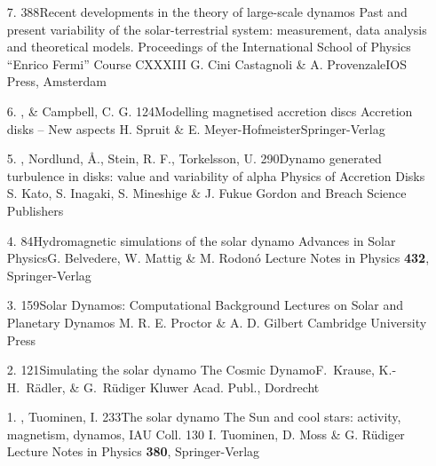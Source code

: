 \begin{itemize}
\item[7.]
\Brandenburg{}
{388}{Recent developments in the theory of large-scale dynamos}
{Past and present variability of the solar-terrestrial system:
measurement, data analysis and theoretical models.
Proceedings of the International School of Physics
``Enrico Fermi'' Course CXXXIII}
{G. Cini Castagnoli \& A. Provenzale}{IOS Press, Amsterdam}

\item[6.]
\Brandenburg, \& Campbell, C. G.
{124}{Modelling magnetised accretion discs}
{Accretion disks -- New aspects}
{H. Spruit \& E. Meyer-Hofmeister}{Springer-Verlag}

\item[5.]
\Brandenburg, Nordlund, \AA., Stein, R. F., Torkelsson, U.
{290}{Dynamo generated turbulence in disks: value and variability of alpha}
{Physics of Accretion Disks}
{S. Kato, S. Inagaki, S. Mineshige \& J. Fukue}
{Gordon and Breach Science Publishers}

\item[4.]
\Brandenburg{}
{84}{Hydromagnetic simulations of the solar dynamo}
{Advances in Solar Physics}{G. Belvedere, W. Mattig \& M. Rodon\'o}
{Lecture Notes in Physics {\bf 432}, Springer-Verlag}

\item[3.]
\Brandenburg{}
{159}{Solar Dynamos: Computational Background}
{Lectures on Solar and Planetary Dynamos}
{M. R. E. Proctor \&  A. D. Gilbert}
{Cambridge University Press}

\item[2.]
\Brandenburg{}
{121}{Simulating the solar dynamo}
{The Cosmic Dynamo}{F.~Krause, K.-H.~R\"adler, \& G.~R\"udiger}
{Kluwer Acad. Publ., Dordrecht}

\item[1.]
\Brandenburg, Tuominen, I.
{233}{The solar dynamo}
{The Sun and cool stars: activity, magnetism, dynamos, IAU Coll. 130}
{I. Tuominen, D. Moss \& G. R\"udiger}
{Lecture Notes in Physics {\bf 380}, Springer-Verlag}

\end{itemize}

